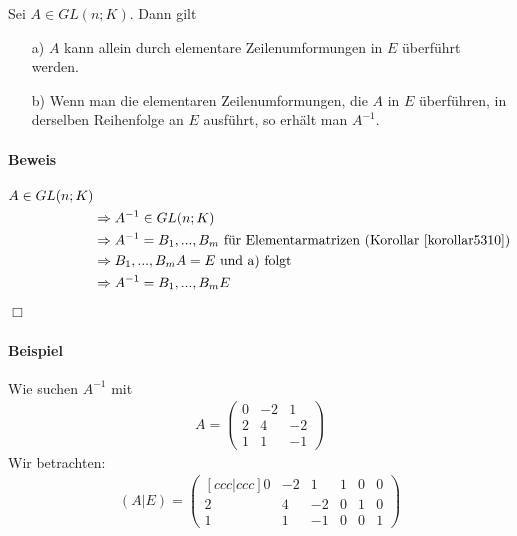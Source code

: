 \documentclass[11pt]{report}
\begin{document}
\begin{korollar}
\label{korollar5311}
Sei $A \in GL(n;K)$. Dann gilt
\begin{itemize}
 \item[a)] $A$ kann allein durch elementare Zeilenumformungen in $E$ überführt werden.
 \item[b)] Wenn man die elementaren Zeilenumformungen, die $A$ in $E$ überführen, in derselben Reihenfolge an $E$ ausführt, so erhält man $A^{-1}$.
\end{itemize}
\end{korollar}

\paragraph{Beweis}
\begin{align}
A \in GL(n;K)& \\
&\Rightarrow A^{-1} \in GL(n;K) \\
&\Rightarrow A^{-1} = B_1, ..., B_m \text{ für Elementarmatrizen (Korollar \ref{korollar5310})} \\
&\Rightarrow B_1, ..., B_m A = E \text{ und a) folgt} \\
&\Rightarrow A^{-1} = B_1, ..., B_m E
\end{align}
\hspace*{1cm} \hfill $\Box$

\paragraph{Beispiel}
Wie suchen $A^{-1}$ mit
\begin{align}
A = \begin{pmatrix} 0 & -2 & 1 \\ 2 & 4 & -2 \\ 1 & 1 & -1\end{pmatrix}
\end{align}
Wir betrachten:
\begin{align}
(A|E) = \begin{pmatrix}[ccc|ccc] 0 & -2 & 1 & 1 & 0 & 0 \\ 2 & 4 & -2 & 0 & 1 & 0\\ 1 & 1 & -1 & 0 & 0 & 1\end{pmatrix}
\end{align}
\end{document}
